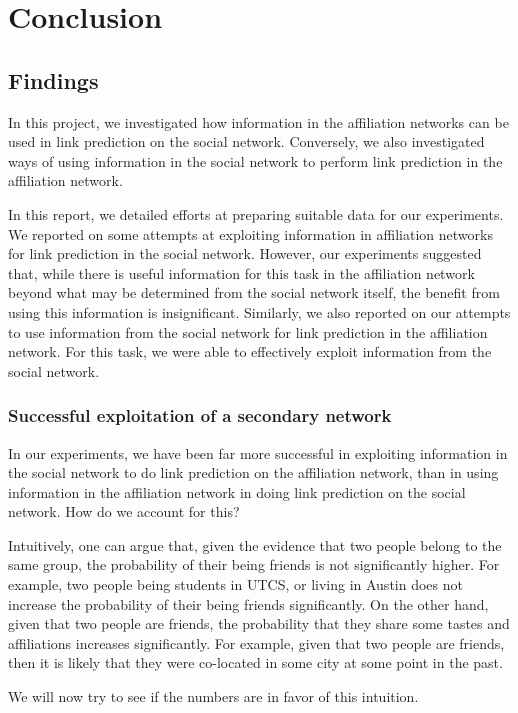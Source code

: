 \documentclass{report}
\begin{document}
\chapter{Conclusion}
\section{Findings}
In this project, we investigated how information in the affiliation networks can be used in link prediction on the social network. Conversely, we also investigated ways of using information in the social network to perform link prediction in the affiliation network.

In this report, we detailed efforts at preparing suitable data for our experiments. We reported on some attempts at exploiting information in affiliation networks for link prediction in the social network. However, our experiments suggested that, while there is useful information for this task in the affiliation network beyond what may be determined from the social network itself, the benefit from using this information is insignificant. Similarly, we also reported on our attempts to use information from the social network for link prediction in the affiliation network. For this task, we were able to effectively exploit information from the social network.

\subsection{Successful exploitation of a secondary network}
In our experiments, we have been far more successful in exploiting information in the social network to do link prediction on the affiliation network, than in using information in the affiliation network in doing link prediction on the social network. How do we account for this?

Intuitively, one can argue that, given the evidence that two people belong to the same group, the probability of their being friends is not significantly higher. For example, two people being students in UTCS, or living in Austin does not increase the probability of their being friends significantly. On the other hand, given that two people are friends, the probability that they share some tastes and affiliations increases significantly. For example, given that two people are friends, then it is likely that they were co-located in some city at some point in the past.

We will now try to see if the numbers are in favor of this intuition.
\end{document}
